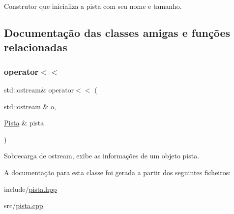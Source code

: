 Construtor que inicializa a pista com seu nome e tamanho. 



\subsection{Documentação das classes amigas e funções relacionadas}
\mbox{\label{classPista_a22c7e3e6f6a5da426ab7e401e3567185}} 
\subsubsection{\texorpdfstring{operator$<$$<$}{operator<<}}
{\footnotesize\ttfamily std\+::ostream\& operator$<$$<$ (\begin{DoxyParamCaption}\item[{std\+::ostream \&}]{o,  }\item[{\hyperlink{classPista}{Pista} \&}]{pista }\end{DoxyParamCaption})\hspace{0.3cm}{\ttfamily [friend]}}



Sobrecarga de ostream, exibe as informações de um objeto pista. 



A documentação para esta classe foi gerada a partir dos seguintes ficheiros\+:\begin{DoxyCompactItemize}
\item 
include/\hyperlink{pista_8hpp}{pista.\+hpp}\item 
src/\hyperlink{pista_8cpp}{pista.\+cpp}\end{DoxyCompactItemize}
